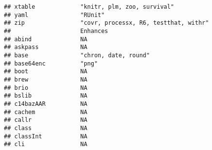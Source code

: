 \documentclass[
]{article}
\begin{document}
\begin{verbatim}
## xtable             "knitr, plm, zoo, survival"                                                                                                                                                                                                                                                                                                                                                                                                                                                       
## yaml               "RUnit"                                                                                                                                                                                                                                                                                                                                                                                                                                                                           
## zip                "covr, processx, R6, testthat, withr"                                                                                                                                                                                                                                                                                                                                                                                                                                             
##                    Enhances                                               
## abind              NA                                                     
## askpass            NA                                                     
## base               "chron, date, round"                                   
## base64enc          "png"                                                  
## boot               NA                                                     
## brew               NA                                                     
## brio               NA                                                     
## bslib              NA                                                     
## c14bazAAR          NA                                                     
## cachem             NA                                                     
## callr              NA                                                     
## class              NA                                                     
## classInt           NA                                                     
## cli                NA                                                     

\end{verbatim}
\end{document}
